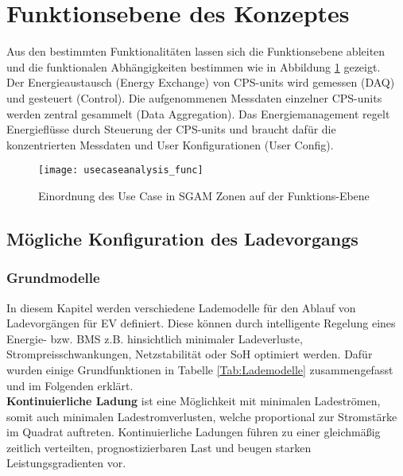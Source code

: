 	\section{Funktionsebene des Konzeptes}
		\label{Kap:Konzept_func}
		Aus den bestimmten Funktionalitäten lassen sich die Funktionsebene ableiten und die funktionalen Abhängigkeiten bestimmen wie in Abbildung \ref{Abb:SGAM_map_func} gezeigt.\\
		
		Der Energieaustausch (Energy Exchange) von CPS-units wird gemessen (DAQ) und gesteuert (Control). Die aufgenommenen Messdaten einzelner CPS-units werden zentral gesammelt (Data Aggregation). Das Energiemanagement regelt Energieflüsse durch Steuerung der CPS-units und braucht dafür die konzentrierten Messdaten und User Konfigurationen (User Config).\\

		\begin{figure}[h]
			\centering
			\texttt{[image: usecaseanalysis\_func]}
			\caption{Einordnung des Use Case in SGAM Zonen auf der Funktions-Ebene}
			\label{Abb:SGAM_map_func}
		\end{figure} 
	
		\subsection{Mögliche Konfiguration des Ladevorgangs} %
			\label{Kap:Lademodelle}
			\subsubsection{Grundmodelle}
				In diesem Kapitel werden verschiedene Lademodelle für den Ablauf von Ladevorgängen für EV definiert. Diese können durch intelligente Regelung eines Energie- bzw. \ac{BMS} z.B. hinsichtlich minimaler Ladeverluste, Strompreisschwankungen, Netzstabilität oder \ac{SoH} optimiert werden. Dafür wurden einige Grundfunktionen in Tabelle \ref{Tab:Lademodelle} zusammengefasst und im Folgenden erklärt.\\
				
				\textbf{Kontinuierliche Ladung} ist eine Möglichkeit mit minimalen Ladeströmen, somit auch minimalen Ladestromverlusten, welche proportional zur Stromstärke im Quadrat auftreten. Kontinuierliche Ladungen führen zu einer gleichmäßig zeitlich verteilten, prognostizierbaren Last und beugen starken Leistungsgradienten vor.\\
			
